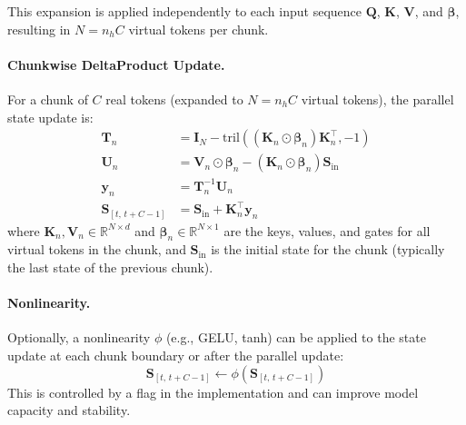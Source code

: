 \documentclass[10pt,a4paper]{article}
\begin{document}
This expansion is applied independently to each input sequence $\mathbf{Q}$, $\mathbf{K}$, $\mathbf{V}$, and $\boldsymbol{\beta}$, resulting in $N = n_h C$ virtual tokens per chunk.


\paragraph{Chunkwise DeltaProduct Update.}

For a chunk of $C$ real tokens (expanded to $N = n_h C$ virtual tokens), the parallel state update is:
\begin{align}
    \mathbf{T}_n &= \mathbf{I}_N - \mathrm{tril}\left((\mathbf{K}_n \odot \boldsymbol{\beta}_n) \mathbf{K}_n^\top, -1\right) \label{eq:triangular-nh} \\
    \mathbf{U}_n &= \mathbf{V}_n \odot \boldsymbol{\beta}_n - (\mathbf{K}_n \odot \boldsymbol{\beta}_n) \mathbf{S}_{\mathrm{in}} \\
    \mathbf{y}_n &= \mathbf{T}_n^{-1} \mathbf{U}_n \\
    \mathbf{S}_{[t,\,t+C-1]} &= \mathbf{S}_{\mathrm{in}} + \mathbf{K}_n^\top \mathbf{y}_n
    \label{eq:chunk-deltaproduct}
\end{align}
where $\mathbf{K}_n, \mathbf{V}_n \in \mathbb{R}^{N \times d}$ and $\boldsymbol{\beta}_n \in \mathbb{R}^{N \times 1}$ are the keys, values, and gates for all virtual tokens in the chunk, and $\mathbf{S}_{\mathrm{in}}$ is the initial state for the chunk (typically the last state of the previous chunk).


\paragraph{Nonlinearity.}

Optionally, a nonlinearity $\phi$ (e.g., GELU, tanh) can be applied to the state update at each chunk boundary or after the parallel update:
\begin{equation}
    \mathbf{S}_{[t,\,t+C-1]} \leftarrow \phi(\mathbf{S}_{[t,\,t+C-1]})
\end{equation}
This is controlled by a flag in the implementation and can improve model capacity and stability.
\end{document}
